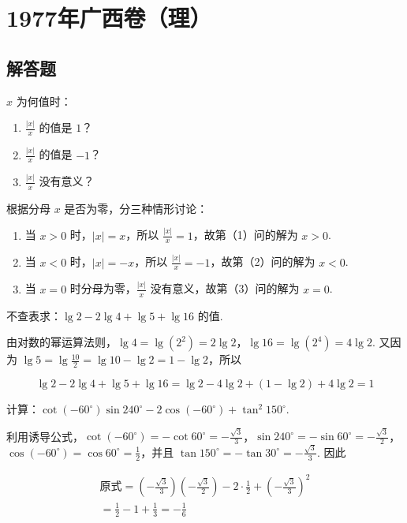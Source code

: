 \chapter{1977年广西卷（理）}

\section{解答题}

\begin{problem}
\( x \) 为何值时：

\begin{enumerate}
\item \( \frac{|x|}{x} \) 的值是 \( 1 \)？
\item \( \frac{|x|}{x} \) 的值是 \( -1 \)？
\item \( \frac{|x|}{x} \) 没有意义？
\end{enumerate}
\end{problem}

\begin{solution}
根据分母 \(x\) 是否为零，分三种情形讨论：

\begin{enumerate}
\item 当 \(x>0\) 时，\(|x|=x\)，所以 \(\frac{|x|}{x}=1\)，故第（1）问的解为 \(x>0\).
\item 当 \(x<0\) 时，\(|x|=-x\)，所以 \(\frac{|x|}{x}=-1\)，故第（2）问的解为 \(x<0\).
\item 当 \(x=0\) 时分母为零，\(\frac{|x|}{x}\) 没有意义，故第（3）问的解为 \(x=0\).
\end{enumerate}
\end{solution}

\begin{problem}
不查表求：\(\lg2-2\lg4+\lg5+\lg16\) 的值.
\end{problem}

\begin{solution}
由对数的幂运算法则，\(\lg4=\lg\left(2^2\right)=2\lg2\)，\(\lg16=\lg\left(2^4\right)=4\lg2\). 又因为 \(\lg5=\lg\frac{10}{2}=\lg10-\lg2=1-\lg2\)，所以

\[
\lg2-2\lg4+\lg5+\lg16=\lg2-4\lg2+(1-\lg2)+4\lg2=1
\]
\end{solution}

\begin{problem}
计算：\(\cot\left( -60^\circ \right)\sin240^\circ-2\cos\left( -60^\circ \right)+\tan^2 150^\circ\).
\end{problem}

\begin{solution}
利用诱导公式，\(\cot\left( -60^\circ \right)=-\cot60^\circ=-\frac{\sqrt{3}}{3}\)，\(\sin240^\circ=-\sin60^\circ=-\frac{\sqrt{3}}{2}\)，\(\cos\left( -60^\circ \right)=\cos60^\circ=\frac{1}{2}\)，并且 \(\tan150^\circ=-\tan30^\circ=-\frac{\sqrt{3}}{3}\). 因此

\[
\begin{gathered}
\text{原式}=\left(-\frac{\sqrt{3}}{3}\right)\left(-\frac{\sqrt{3}}{2}\right)-2\cdot\frac{1}{2}+\left(-\frac{\sqrt{3}}{3}\right)^2\\
=\frac{1}{2}-1+\frac{1}{3}=-\frac{1}{6}
\end{gathered}
\]
\end{solution}

